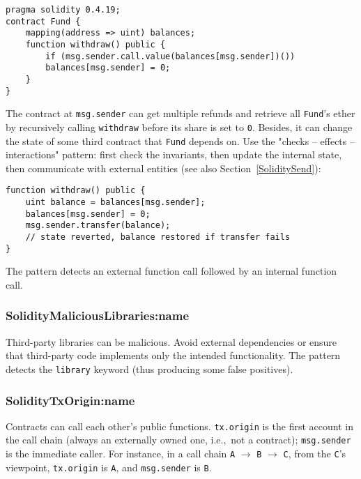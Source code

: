 \begin{lstlisting}[language=Solidity]
pragma solidity 0.4.19;
contract Fund {
	mapping(address => uint) balances;
	function withdraw() public {
		if (msg.sender.call.value(balances[msg.sender])())
		balances[msg.sender] = 0;
	}
}
\end{lstlisting}

The contract at \texttt{msg.sender} can get multiple refunds and retrieve all \texttt{Fund}'s ether by recursively calling \texttt{withdraw} before its share is set to \texttt{0}.
Besides, it can change the state of some third contract that \texttt{Fund} depends on.
Use the "checks -- effects -- interactions" pattern: first check the invariants, then update the internal state, then communicate with external entities (see also Section~\ref{SoliditySend}):
\begin{lstlisting}[language=Solidity]
function withdraw() public {
	uint balance = balances[msg.sender];	
	balances[msg.sender] = 0;
	msg.sender.transfer(balance);
	// state reverted, balance restored if transfer fails
}
\end{lstlisting}

The pattern detects an external function call followed by an internal function call.

\subsubsection{\let\letcs\texapiletcs \usevalue SolidityMaliciousLibraries:name \let\letcs\etoolboxletcs} \label{SolidityMaliciousLibraries}

Third-party libraries can be malicious.
Avoid external dependencies or ensure that third-party code implements only the intended functionality.
The pattern detects the \texttt{library} keyword (thus producing some false positives).

\subsubsection{\let\letcs\texapiletcs \usevalue SolidityTxOrigin:name \let\letcs\etoolboxletcs} \label{SolidityTxOrigin}

Contracts can call each other's public functions.
\texttt{tx.origin} is the first account in the call chain (always an externally owned one, i.e.,~not a contract); \texttt{msg.sender} is the immediate caller.
For instance, in a call chain \texttt{A} $\rightarrow$ \texttt{B} $\rightarrow$ \texttt{C}, from the \texttt{C}'s viewpoint, \texttt{tx.origin} is \texttt{A}, and \texttt{msg.sender} is \texttt{B}.

